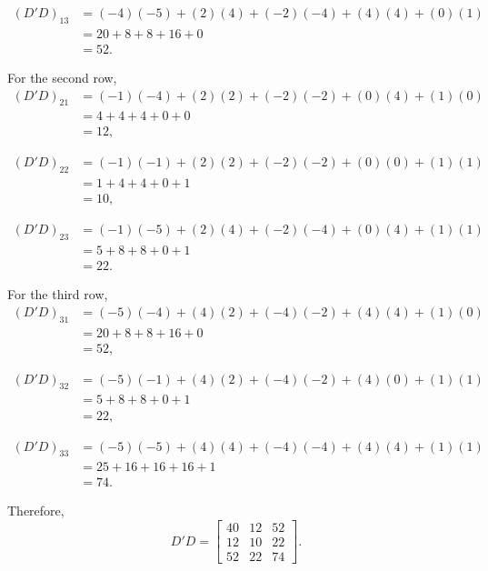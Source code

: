 \documentclass[12pt]{article}
\begin{document}
	\[
	\begin{aligned}
		(D'D)_{13}
		&=(-4)(-5)+(2)(4)+(-2)(-4)+(4)(4)+(0)(1)\\
		&=20+8+8+16+0\\
		&=52.
	\end{aligned}
	\]
	
	For the second row,
	\[
	\begin{aligned}
		(D'D)_{21}
		&=(-1)(-4)+(2)(2)+(-2)(-2)+(0)(4)+(1)(0)\\
		&=4+4+4+0+0\\
		&=12,
	\end{aligned}
	\]
	
	\[
	\begin{aligned}
		(D'D)_{22}
		&=(-1)(-1)+(2)(2)+(-2)(-2)+(0)(0)+(1)(1)\\
		&=1+4+4+0+1\\
		&=10,
	\end{aligned}
	\]
	
	\[
	\begin{aligned}
		(D'D)_{23}
		&=(-1)(-5)+(2)(4)+(-2)(-4)+(0)(4)+(1)(1)\\
		&=5+8+8+0+1\\
		&=22.
	\end{aligned}
	\]
	
	For the third row,
	\[
	\begin{aligned}
		(D'D)_{31}
		&=(-5)(-4)+(4)(2)+(-4)(-2)+(4)(4)+(1)(0)\\
		&=20+8+8+16+0\\
		&=52,
	\end{aligned}
	\]
	
	\[
	\begin{aligned}
		(D'D)_{32}
		&=(-5)(-1)+(4)(2)+(-4)(-2)+(4)(0)+(1)(1)\\
		&=5+8+8+0+1\\
		&=22,
	\end{aligned}
	\]
	
	\[
	\begin{aligned}
		(D'D)_{33}
		&=(-5)(-5)+(4)(4)+(-4)(-4)+(4)(4)+(1)(1)\\
		&=25+16+16+16+1\\
		&=74.
	\end{aligned}
	\]
	
	Therefore,
	\[
	\boxed{
		D'D=
		\begin{bmatrix}
			40&12&52\\
			12&10&22\\
			52&22&74
	\end{bmatrix}}.
	\]
	
\end{document}
